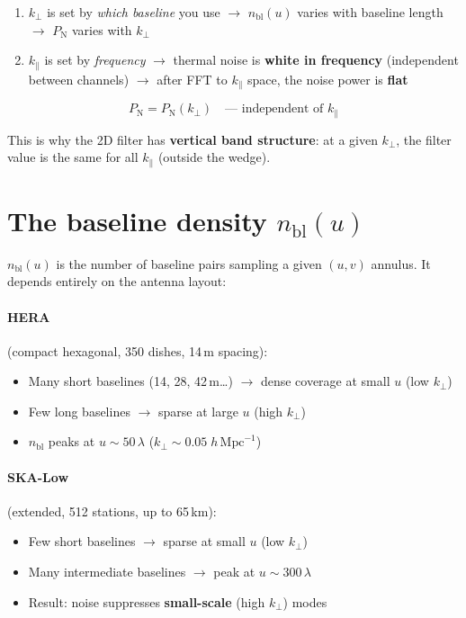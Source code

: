 \documentclass[11pt,a4paper]{article}
\newcommand{\kperp}{k_\perp}
\newcommand{\kpar}{k_\parallel}
\newcommand{\Pnoise}{P_\mathrm{N}}
\newcommand{\nbl}{n_\mathrm{bl}}
\begin{document}
\begin{enumerate}
    \item $\kperp$ is set by \emph{which baseline} you use $\to$ $\nbl(u)$ varies with baseline length $\to$ $\Pnoise$ varies with $\kperp$
    \item $\kpar$ is set by \emph{frequency} $\to$ thermal noise is \textbf{white in frequency} (independent between channels) $\to$ after FFT to $\kpar$ space, the noise power is \textbf{flat}
\end{enumerate}

\begin{equation}
    \Pnoise = \Pnoise(\kperp) \quad \text{--- independent of } \kpar
\end{equation}

This is why the 2D filter has \textbf{vertical band structure}: at a given $\kperp$, the filter value is the same for all $\kpar$ (outside the wedge).

\section{The baseline density $\nbl(u)$}

$\nbl(u)$ is the number of baseline pairs sampling a given $(u,v)$ annulus. It depends entirely on the antenna layout:

\paragraph{HERA} (compact hexagonal, 350 dishes, 14\,m spacing):
\begin{itemize}
    \item Many short baselines (14, 28, 42\,m\ldots) $\to$ dense coverage at small $u$ (low $\kperp$)
    \item Few long baselines $\to$ sparse at large $u$ (high $\kperp$)
    \item $\nbl$ peaks at $u \sim 50\,\lambda$ ($\kperp \sim 0.05\;h\,\mathrm{Mpc}^{-1}$)
\end{itemize}

\paragraph{SKA-Low} (extended, 512 stations, up to 65\,km):
\begin{itemize}
    \item Few short baselines $\to$ sparse at small $u$ (low $\kperp$)
    \item Many intermediate baselines $\to$ peak at $u \sim 300\,\lambda$
    \item Result: noise suppresses \textbf{small-scale} (high $\kperp$) modes
\end{itemize}
\end{document}
